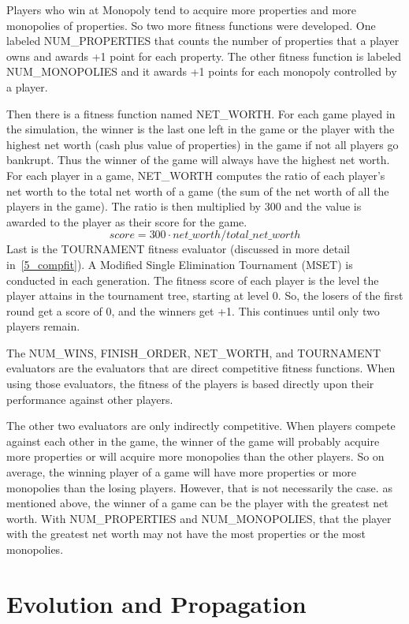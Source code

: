 Players who win at Monopoly tend to acquire more
properties and more monopolies of properties. So two more fitness functions were
developed. One labeled NUM\_PROPERTIES that counts the number of properties that
a player owns and awards +1 point for each property. The other fitness function
is labeled NUM\_MONOPOLIES and it awards +1 points for each monopoly controlled
by a player.

Then there is a fitness function named NET\_WORTH. For each game played in the
simulation, the winner is the last one left in the game or the player with the
highest net worth (cash plus value of properties) in the game if not all players
go bankrupt. Thus the winner of the game will always have the highest net worth.
For each player in a game, NET\_WORTH computes the ratio of each player's net
worth to the total net worth of a game (the sum of the net worth of all the
players in the game). The ratio is then multiplied by 300 and the value is
awarded to the player as their score for the game.
\begin{equation*}
score = 300 \cdot net\_worth / total\_net\_worth
\end{equation*}
Last is the TOURNAMENT fitness evaluator (discussed in more detail
in~\ref{5_compfit}). A Modified Single Elimination Tournament (MSET) is
conducted in each generation. The fitness score of each player is the level the
player attains in the tournament tree, starting at level 0. So, the losers of
the first round get a score of 0, and the winners get +1. This continues until
only two players remain.

The NUM\_WINS, FINISH\_ORDER, NET\_WORTH, and TOURNAMENT evaluators are the
evaluators that are direct competitive fitness functions. When using those
evaluators, the fitness of the players is based directly upon their performance
against other players.

The other two evaluators are only indirectly competitive. When players compete
against each other in the game, the winner of the game will probably 
acquire more properties or will acquire more monopolies than the other players.
So on average, the winning player of a game will have more properties or more
monopolies than the losing players. However, that is not necessarily the case.
as mentioned above, the winner of a game can be the player with the greatest net
worth. With NUM\_PROPERTIES and NUM\_MONOPOLIES, that the player with the
greatest net worth may not have the most properties or the most monopolies.

\section{Evolution and Propagation} \label{5_evoprop}


